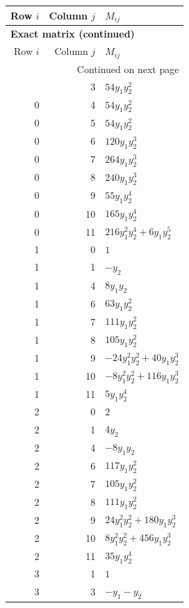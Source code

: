 \documentclass[10pt,a4paper]{article}
\begin{document}
{\small\setlength{\tabcolsep}{7pt}\begin{longtable}{rrp{125mm}}
\toprule Row $i$ & Column $j$ & $M_{ij}$\\\midrule\endfirsthead
\multicolumn{3}{l}{\textbf{Exact matrix (continued)}}\\
\toprule Row $i$ & Column $j$ & $M_{ij}$\\\midrule\endhead
\midrule\multicolumn{3}{r}{Continued on next page}\\\endfoot\bottomrule\endlastfoot
0 & 3 & $54 y_{1} y_{2}^{2}$\\
0 & 4 & $54 y_{1} y_{2}^{2}$\\
0 & 5 & $54 y_{1} y_{2}^{2}$\\
0 & 6 & $120 y_{1} y_{2}^{3}$\\
0 & 7 & $264 y_{1} y_{2}^{3}$\\
0 & 8 & $240 y_{1} y_{2}^{3}$\\
0 & 9 & $55 y_{1} y_{2}^{4}$\\
0 & 10 & $165 y_{1} y_{2}^{4}$\\
0 & 11 & $216 y_{1}^{2} y_{2}^{4} + 6 y_{1} y_{2}^{5}$\\
1 & 0 & $1$\\
1 & 1 & $- y_{2}$\\
1 & 4 & $8 y_{1} y_{2}$\\
1 & 6 & $63 y_{1} y_{2}^{2}$\\
1 & 7 & $111 y_{1} y_{2}^{2}$\\
1 & 8 & $105 y_{1} y_{2}^{2}$\\
1 & 9 & $- 24 y_{1}^{2} y_{2}^{2} + 40 y_{1} y_{2}^{3}$\\
1 & 10 & $- 8 y_{1}^{2} y_{2}^{2} + 116 y_{1} y_{2}^{3}$\\
1 & 11 & $5 y_{1} y_{2}^{4}$\\
2 & 0 & $2$\\
2 & 1 & $4 y_{2}$\\
2 & 4 & $- 8 y_{1} y_{2}$\\
2 & 6 & $117 y_{1} y_{2}^{2}$\\
2 & 7 & $105 y_{1} y_{2}^{2}$\\
2 & 8 & $111 y_{1} y_{2}^{2}$\\
2 & 9 & $24 y_{1}^{2} y_{2}^{2} + 180 y_{1} y_{2}^{3}$\\
2 & 10 & $8 y_{1}^{2} y_{2}^{2} + 456 y_{1} y_{2}^{3}$\\
2 & 11 & $35 y_{1} y_{2}^{4}$\\
3 & 1 & $1$\\
3 & 3 & $- y_{1} - y_{2}$\\

\end{longtable}}
\end{document}
